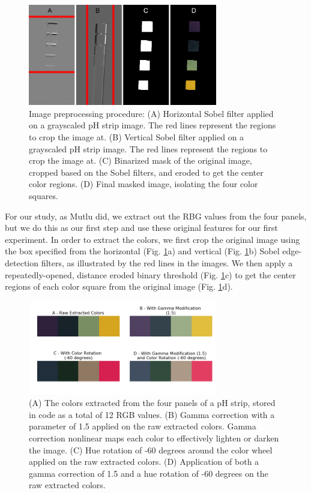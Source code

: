 \documentclass[journal]{IEEEtran}
\begin{document}
\begin{figure}
\centering
\includegraphics[width=3.25in]{Fig_2.png}
\caption{Image preprocessing procedure: (A) Horizontal Sobel filter applied on a grayscaled pH strip image. The red lines represent the regions to crop the image at. (B) Vertical Sobel filter applied on a grayscaled pH strip image. The red lines represent the regions to crop the image at. (C) Binarized mask of the original image, cropped based on the Sobel filters, and eroded to get the center color regions. (D) Final masked image, isolating the four color squares.}
\label{pre-process}
\end{figure}

For our study, as Mutlu did, we extract out the RBG values from the four panels, but we do this as our first step and use these original features for our first experiment. In order to extract the colors, we first crop the original image using the box specified from the horizontal (Fig. \ref{pre-process}a) and vertical (Fig. \ref{pre-process}b) Sobel edge-detection filters, as illustrated by the red lines in the images. We then apply a repeatedly-opened, distance eroded binary threshold (Fig. \ref{pre-process}c) to get the center regions of each color square from the original image (Fig. \ref{pre-process}d).

\begin{figure}
\centering
\includegraphics[width=3.25in]{Fig_3.png}
\caption{(A) The colors extracted from the four panels of a pH strip, stored in code as a total of 12 RGB values. (B) Gamma correction with a parameter of 1.5 applied on the raw extracted colors. Gamma correction nonlinear maps each color to effectively lighten or darken the image. (C) Hue rotation of -60 degrees around the color wheel applied on the raw extracted colors. (D) Application of both a gamma correction of 1.5 and a hue rotation of -60 degrees on the raw extracted colors.}
\label{four-colors}
\end{figure}
\end{document}
